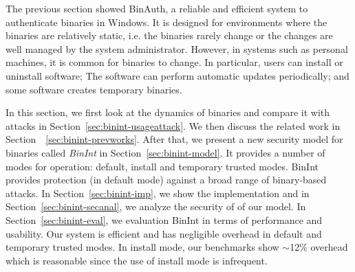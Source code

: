 
The previous section showed BinAuth, a reliable and efficient system
to authenticate binaries in Windows.
It is designed for environments where the binaries are relatively static,
i.e. the binaries rarely change or the changes are well managed by
the system administrator.
However, in systems such as personal machines, it is common for binaries
to change.
In particular, users can install or uninstall software;
The software can perform automatic updates periodically;
and some software creates temporary binaries.

In this section, we first look at the dynamics of binaries and compare
it with attacks in Section~\ref{sec:binint-usageattack}.
We then discuss the related work in Section~~\ref{sec:binint-prevworks}.
After that, we present a new security model for binaries called
{\em BinInt} in Section~\ref{sec:binint-model}.
It provides a number of modes for operation: default, install
and temporary trusted modes.
BinInt provides protection (in default mode) against a broad range of
binary-based attacks.
In Section~\ref{sec:binint-imp}, we show the implementation and
in Section~\ref{sec:binint-secanal}, we analyze the security of
of our model.
In Section~\ref{sec:binint-eval}, we evaluation BinInt in terms of
performance and usability.
Our system is efficient and has negligible overhead in default and temporary
trusted modes. 
In install mode, our benchmarks
show $\sim$12\% overhead which is reasonable since
the use of install mode is infrequent.

